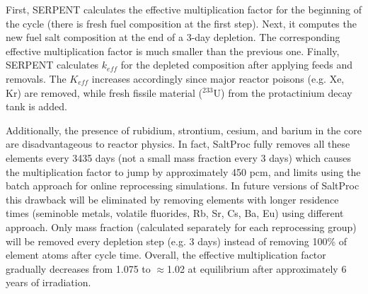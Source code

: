 First, SERPENT calculates the effective multiplication factor for the beginning 
of the cycle (there is fresh fuel composition at the first step). Next, it 
computes the new fuel salt composition at the end of a 3-day depletion. The 
corresponding effective multiplication factor is much smaller than the previous 
one. Finally, SERPENT calculates $k_{eff}$ for the depleted composition after 
applying feeds and removals. The $K_{eff}$ increases accordingly since major reactor 
poisons (e.g. Xe, Kr) are removed, while fresh fissile material ($^{233}$U) 
from the protactinium decay tank is added.  

Additionally, the presence of rubidium, strontium, cesium, and barium in the 
core are disadvantageous to reactor physics. In fact, SaltProc fully removes all these elements every 3435 days (not a small mass fraction every 3 days) 
which causes the multiplication factor to jump by approximately 450 
pcm, and limits using the batch approach for online reprocessing simulations. 
In future versions of SaltProc this drawback will be eliminated by removing 
elements with longer residence times (seminoble metals, volatile fluorides, Rb, Sr,
 Cs, Ba, Eu) using different approach. Only mass fraction (calculated 
 separately for each reprocessing group) will be removed every depletion step 
 (e.g. 3 days) instead of removing 100\% of element atoms after cycle time.
Overall, the effective multiplication factor gradually decreases from 1.075 to 
$\approx$1.02 at equilibrium after approximately 6 years of irradiation. 

